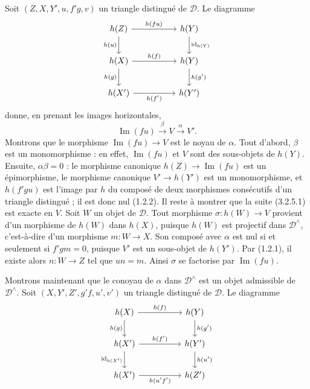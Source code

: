 \clearpage
{}%
\begingroup\small\setlength{\parskip}{0pt}\setlength{\emergencystretch}{1.5em}
Soit $(Z,X,Y',u,f'g,v)$ un triangle distingué de $\mathcal D$. Le diagramme
\[
\begin{tikzcd}[column sep=5em,row sep=2.1em]
h(Z)\arrow[r,"h(fu)"]\arrow[d,"h(u)"']&h(Y)\arrow[d,"\operatorname{id}_{h(Y)}"]\\
h(X)\arrow[r,"h(f)"]\arrow[d,"h(g)"']&h(Y)\arrow[d,"h(g')"]\\
h(X')\arrow[r,"h(f')"']&h(Y')
\end{tikzcd}
\]
donne, en prenant les images horizontales,
\[
\operatorname{Im}(fu)\xrightarrow{\beta}V\xrightarrow{\alpha}V'.
\tag{3.2.5.1}
\]
Montrons que le morphisme $\operatorname{Im}(fu)\to V$ est le noyau de
$\alpha$. Tout d'abord, $\beta$ est un monomorphisme : en effet,
$\operatorname{Im}(fu)$ et $V$ sont des sous-objets de $h(Y)$. Ensuite,
$\alpha\beta=0$ : le morphisme canonique
$h(Z)\to\operatorname{Im}(fu)$ est un épimorphisme, le morphisme canonique
$V'\to h(Y')$ est un monomorphisme, et $h(f'gu)$ est l'image par $h$ du
composé de deux morphismes consécutifs d'un triangle distingué ; il est donc
nul (1.2.2). Il reste à montrer que la suite (3.2.5.1) est exacte en $V$.
Soit $W$ un objet de
$\mathcal D$. Tout morphisme $\sigma\colon h(W)\to V$ provient d'un morphisme
de $h(W)$ dans $h(X)$, puisque $h(W)$ est projectif dans
$\mathcal D^\wedge$, c'est-à-dire d'un morphisme $m\colon W\to X$. Son
composé avec $\alpha$ est nul si et seulement si $f'gm=0$, puisque $V'$ est
un sous-objet de $h(Y')$. Par (1.2.1), il existe alors
$n\colon W\to Z$ tel que $un=m$. Ainsi $\sigma$ se factorise par
$\operatorname{Im}(fu)$.

Montrons maintenant que le conoyau de $\alpha$ dans $\mathcal D^\wedge$ est
un objet admissible de $\mathcal D^\wedge$. Soit
$(X,Y',Z',g'f,u',v')$ un triangle distingué de $\mathcal D$. Le diagramme
\[
\begin{tikzcd}[column sep=5em,row sep=2em]
h(X)\arrow[r,"h(f)"]\arrow[d,"h(g)"']&h(Y)\arrow[d,"h(g')"]\\
h(X')\arrow[r,"h(f')"]\arrow[d,"\operatorname{id}_{h(X')}"']&h(Y')\arrow[d,"h(u')"]\\
h(X')\arrow[r,"h(u'f')"']&h(Z')
\end{tikzcd}
\]
\endgroup
